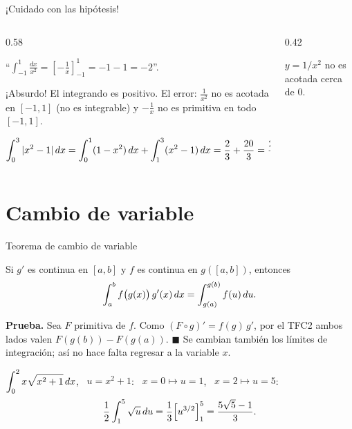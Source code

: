 \documentclass[10pt,aspectratio=169]{beamer}
\begin{document}
\begin{frame}{¡Cuidado con las hipótesis!}
  \begin{columns}
    \begin{column}{0.58\textwidth}
      \begin{ejemplo}
        ``$\displaystyle\int_{-1}^1\frac{dx}{x^2}=\left[-\frac1x\right]_{-1}^1=-1-1=-2$''.
        \medskip

        ¡Absurdo! El integrando es positivo. El error: $\frac1{x^2}$ no es acotada en $[-1,1]$ (no es
        integrable) y $-\frac1x$ no es primitiva en todo $[-1,1]$.
      \end{ejemplo}
      \begin{ejemplo}
        $\displaystyle\int_0^3|x^2-1|\,dx=\int_0^1(1-x^2)\,dx+\int_1^3(x^2-1)\,dx=\frac23+\frac{20}{3}=\frac{22}{3}.$
      \end{ejemplo}
    \end{column}
    \begin{column}{0.42\textwidth}
      \centering

      \small $y=1/x^2$ no es acotada cerca de $0$.
    \end{column}
  \end{columns}
\end{frame}

\section{Cambio de variable}

\begin{frame}{Teorema de cambio de variable}
  \begin{teorema}
    Si $g'$ es continua en $[a,b]$ y $f$ es continua en $g([a,b])$, entonces
    \[ \int_a^bf\big(g(x)\big)\,g'(x)\,dx=\int_{g(a)}^{g(b)}f(u)\,du. \]
  \end{teorema}
  \textbf{Prueba.} Sea $F$ primitiva de $f$. Como $(F\circ g)'=f(g)\,g'$, por el TFC2 ambos lados valen
  $F(g(b))-F(g(a))$. $\blacksquare$
  \alert{Se cambian también los límites de integración}; así no hace falta regresar a la variable $x$.
  \begin{ejemplo}[1]
    $\displaystyle\int_0^2x\sqrt{x^2+1}\,dx$, \ $u=x^2+1$: \ $x=0\mapsto u=1$, \ $x=2\mapsto u=5$:
    \[ \frac12\int_1^5\sqrt u\,du=\frac13\Big[u^{3/2}\Big]_1^5=\frac{5\sqrt5-1}{3}. \]
  \end{ejemplo}
\end{frame}
\end{document}
